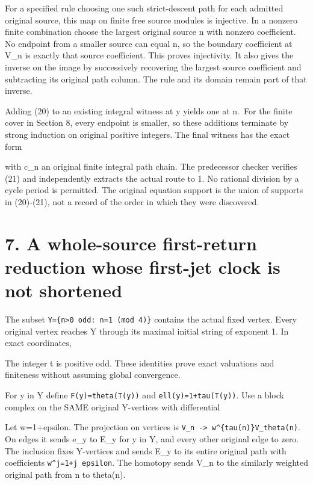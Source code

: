 For a specified rule choosing one such strict-descent path for each
admitted original source, this map on finite free source modules is
injective. In a nonzero finite combination choose the largest original
source n with nonzero coefficient. No endpoint from a smaller source can
equal n, so the boundary coefficient at V\_n is exactly that source
coefficient. This proves injectivity. It also gives the inverse on the
image by successively recovering the largest source coefficient and
subtracting its original path column. The rule and its domain remain
part of that inverse.

Adding (20) to an existing integral witness at y yields one at n.~For
the finite cover in Section 8, every endpoint is smaller, so these
additions terminate by strong induction on original positive integers.
The final witness has the exact form


with c\_n an original finite integral path chain. The predecessor
checker verifies (21) and independently extracts the actual route to 1.
No rational division by a cycle period is permitted. The original
equation support is the union of supports in (20)-(21), not a record of
the order in which they were discovered.

\section{7. A whole-source first-return reduction whose first-jet clock
is not shortened}

The subset \texttt{Y=\{n\textgreater{}0\ odd:\ n=1\ (mod\ 4)\}} contains
the actual fixed vertex. Every original vertex reaches Y through its
maximal initial string of exponent 1. In exact coordinates,


The integer t is positive odd. These identities prove exact valuations
and finiteness without assuming global convergence.

For y in Y define \nolinkurl{F(y)=theta(T(y))} and
\nolinkurl{ell(y)=1+tau(T(y))}. Use a block complex on the SAME original
Y-vertices with differential


Let w=1+epsilon. The projection on vertices is
\texttt{V\_n\ -\textgreater{}\ w\^{}\{tau(n)\}V\_theta(n)}. On edges it
sends e\_y to E\_y for y in Y, and every other original edge to zero.
The inclusion fixes Y-vertices and sends E\_y to its entire original
path with coefficients \nolinkurl{w^j=1+j epsilon}. The homotopy sends
V\_n to the similarly weighted original path from n to theta(n).

